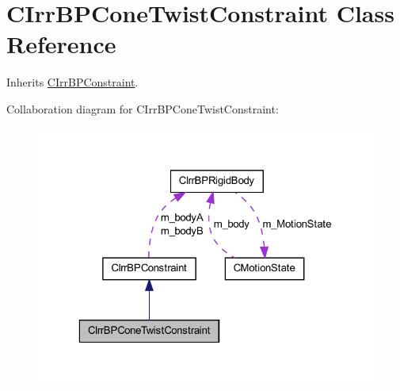 \hypertarget{class_c_irr_b_p_cone_twist_constraint}{
\section{CIrrBPConeTwistConstraint Class Reference}
\label{class_c_irr_b_p_cone_twist_constraint}
}


Inherits \hyperlink{class_c_irr_b_p_constraint}{CIrrBPConstraint}.



Collaboration diagram for CIrrBPConeTwistConstraint:\nopagebreak
\begin{figure}[H]
\begin{center}
\leavevmode
\includegraphics[width=323pt]{class_c_irr_b_p_cone_twist_constraint__coll__graph}
\end{center}
\end{figure}
